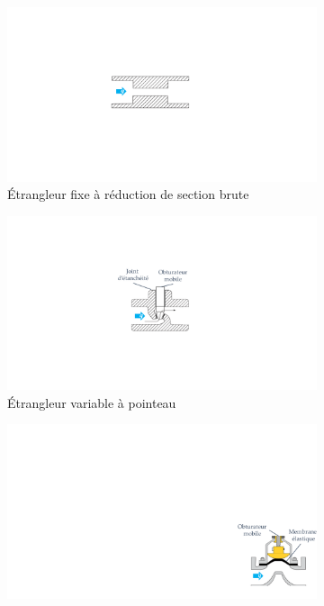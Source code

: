 \begin{figure}[!htbp]
	\begin{center}
		\begin{subfigure}[t]{0.32\textwidth}
			\captionsetup{justification=centering}
			\includegraphics[trim={11cm 6.5cm 13.5cm 7.2cm},clip,width=\textwidth]{../Chap2/Figure/etrangleur_fixe.pdf}
			\caption{Étrangleur fixe à réduction de section brute}
			\label{fig:etrangleur_fixe}
		\end{subfigure}
		\begin{subfigure}[t]{0.3\textwidth}
			\captionsetup{justification=centering}
			\includegraphics[trim={12cm 6cm 14cm 5.5cm},clip,width=\textwidth]{../Chap2/Figure/etrangleur_pointeau.pdf}
			\caption{Étrangleur variable à pointeau}
			\label{fig:etrangleur_pointeau}
		\end{subfigure}
		\begin{subfigure}[t]{0.34\textwidth}
			\captionsetup{justification=centering}
			\includegraphics[trim={25cm 1.2cm 0cm 10.6cm},clip,width=\textwidth]{../Chap2/Figure/etrangleur_membrane32.pdf}

\end{subfigure}
\end{center}
\end{figure}
